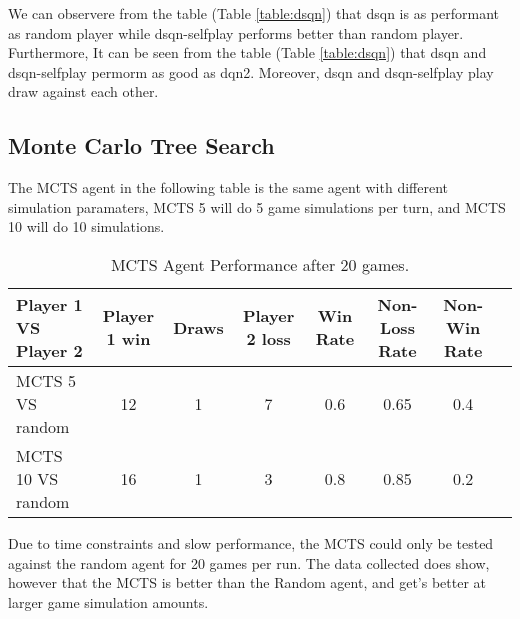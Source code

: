 \documentclass[../report.tex]{subfiles}
\begin{document}
We can observere from the table (Table \ref{table:dsqn}) that dsqn is as performant as random player while dsqn-selfplay performs better than random player. Furthermore, It can be seen from the table (Table \ref{table:dsqn}) that dsqn and dsqn-selfplay permorm as good as dqn2. Moreover, dsqn and dsqn-selfplay play draw against each other.

\subsection{Monte Carlo Tree Search}
The MCTS agent in the following table is the same agent with different simulation paramaters, MCTS 5 will do 5 game simulations per turn, and MCTS 10 will do 10 simulations.
\begin{table}[!htbp]
    \centering
    \caption{MCTS Agent Performance after 20 games.}\label{table:MCTS}
    \begin{tabular}{lccccccc}
        \toprule
        Player 1 VS Player 2            & Player 1 win & Draws & Player 2 loss & Win Rate & Non-Loss Rate & Non-Win Rate \\
        \midrule
        MCTS 5 VS random                  & 12    & 1    & 7      & 0.6        & 0.65             & 0.4            \\
        MCTS 10 VS random         & 16   & 1     & 3     & 0.8     & 0.85          & 0.2         \\
       \bottomrule
    \end{tabular}
\end{table}

Due to time constraints and slow performance, the MCTS could only be tested against the random agent for 20 games per run. The data collected does show, however that the MCTS is better than the Random agent, and get's better at larger game simulation amounts.
\end{document}
